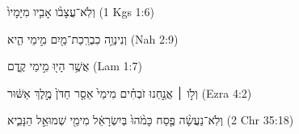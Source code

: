 
\begin{exe}

\ex\label{postdur_days_ex1}
\texthebrew{
וְלֹֽא־עֲצָבֹ֨ו אָבִ֤יו מִיָּמָיו֙ 
} (1 Kgs 1:6)

\ex\label{postdur_days_ex2}
\texthebrew{
וְנִינְוֵ֥ה כִבְרֵֽכַת־מַ֖יִם מִ֣ימֵי הִ֑יא 
} (Nah 2:9)

\ex\label{postdur_days_ex3}
\texthebrew{
אֲשֶׁ֥ר הָי֖וּ מִ֣ימֵי קֶ֑דֶם 
} (Lam 1:7)

\ex\label{postdur_days_ex4}
\texthebrew{
וְלֹ֣ו ׀ אֲנַ֣חְנוּ זֹבְחִ֗ים מִימֵי֙ אֵסַ֤ר חַדֹּן֙ מֶ֣לֶךְ אַשּׁ֔וּר 
} (Ezra 4:2)

\ex\label{postdur_days_ex5}
\texthebrew{
וְלֹֽא־נַעֲשָׂ֨ה פֶ֤סַח כָּמֹ֨הוּ֙ בְּיִשְׂרָאֵ֔ל מִימֵ֖י שְׁמוּאֵ֣ל הַנָּבִ֑יא 
} (2 Chr 35:18)

\end{exe}
